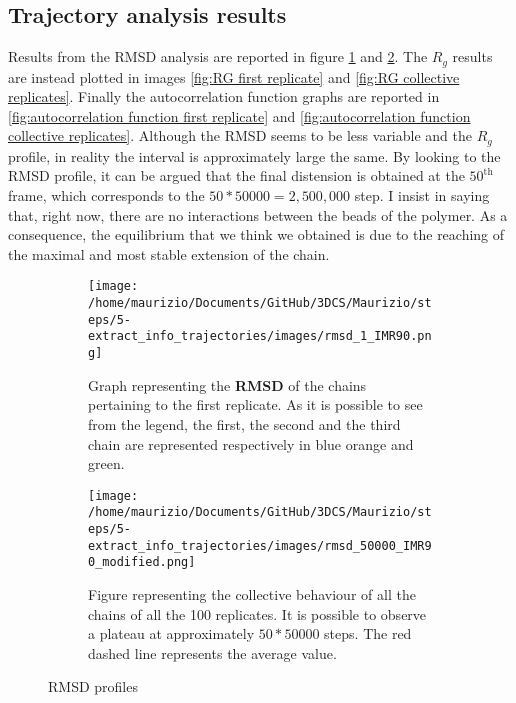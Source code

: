 \subsection{Trajectory analysis results} \label{chap: trajectory analysis results}

Results from the RMSD analysis are reported in figure \ref{fig:RMSD first replicate} and \ref{fig:RMSD collective replicates}. The $R_g$ results are instead plotted in images \ref{fig:RG first replicate} and \ref{fig:RG collective replicates}. Finally the autocorrelation function graphs are reported in \ref{fig:autocorrelation function first replicate} and \ref{fig:autocorrelation function collective replicates}. Although the RMSD seems to be less variable and the $R_g$ profile, in reality the interval is approximately large the same. By looking to the RMSD profile, it can be argued that the final distension is obtained at the $50^{\text{th}}$ frame, which corresponds to the $50 * 50000 = 2,500,000$ step. I insist in saying that, right now, there are no interactions between the beads of the polymer. As a consequence, the equilibrium that we think we obtained is due to the reaching of the maximal and most stable extension of the chain. 


\begin{figure}[H]
    \centering
    
    \begin{subfigure}{0.49\textwidth}
      \texttt{[image: /home/maurizio/Documents/GitHub/3DCS/Maurizio/steps/5-extract\_info\_trajectories/images/rmsd\_1\_IMR90.png]}
      \caption{Graph representing the \textbf{RMSD} of the chains pertaining to the first replicate. As it is possible to see from the legend, the first, the second and the third chain are represented respectively in blue orange and green.}
      \label{fig:RMSD first replicate}
    \end{subfigure}
    \hfill
    \begin{subfigure}{0.49\textwidth}
      \texttt{[image: /home/maurizio/Documents/GitHub/3DCS/Maurizio/steps/5-extract\_info\_trajectories/images/rmsd\_50000\_IMR90\_modified.png]}
      \caption{Figure representing the collective behaviour of all the chains of all the 100 replicates. It is possible to observe a plateau at approximately $50*50000$ steps. The red dashed line represents the average value.}
      \label{fig:RMSD collective replicates}
    \end{subfigure}
  
    \caption{RMSD profiles}
    \label{fig:RMSD figures}
\end{figure}


